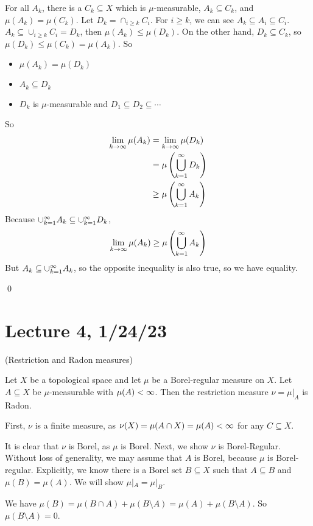 \documentclass[x11names,reqno,14pt]{extarticle}
\newcommand{\seq}[1]{_{#1 = 1}^\oo}
\newcommand{\cupk}{\cup\seq{k}}
\newcommand{\bigcupk}{\bigcup\seq{k}}
\begin{document}
For all $A_k$, there is a $C_k\subseteq X$ which is $\mu$-measurable, $A_k \subseteq C_k$, and $\mu(A_k) = \mu(C_k)$. Let $D_k = \cap_{i\geq k}C_i$. For $i \geq k$, we can see $A_k \subseteq A_i \subseteq C_i$. $A_k \subseteq \cup_{i\geq k}C_i = D_k$, then $\mu(A_k)\leq\mu(D_k)$. On the other hand, $D_k\subseteq C_k$, so $\mu(D_k)\leq\mu(C_k) = \mu(A_k)$. So
\begin{itemize}
\item $\mu(A_k) = \mu(D_k)$ 
\item $A_k \subseteq D_k$ 
\item $D_k$ is $\mu$-measurable and $D_1 \subseteq D_2 \subseteq \cdots $
\end{itemize}
So
\begin{align*}
\lim_{k\to\oo}\mu(A_k) & = \lim_{k\to\oo}\mu(D_k) \\
						      & = \mu\left(\bigcupk D_k\right) \\
								& \geq \mu\left(\bigcupk A_k\right) \\
\end{align*}
Because $\cupk A_k \subseteq \cupk D_k$, 
\[
\lim_{k\to\oo}\mu(A_k)\geq\mu\left(\bigcupk A_k\right) 
\]
But $A_k \subseteq \cupk A_k$, so the opposite inequality is also true, so we have equality. 

\qed

\section*{Lecture 4, 1/24/23}

\thm (Restriction and Radon measures)

Let $X$ be a topological space and let $\mu$ be a Borel-regular measure on $X$. Let $A \subseteq X$ be $\mu$-measurable with $\mu(A)<\infty$. Then the restriction measure $\nu = \mu|_A$ is Radon. 

\proof

First, $\nu$ is a finite measure, as $\nu(X) = \mu(A \cap X) = \mu(A) < \infty$ for any $C \subseteq X$. 

It is clear that $\nu$ is Borel, as $\mu$ is Borel. Next, we show $\nu$ is Borel-Regular. Without loss of generality, we may assume that $A$ is Borel, because $\mu$ is Borel-regular. Explicitly, we know there is a Borel set $B \subseteq X$ such that $A \subseteq B$ and $\mu(B) = \mu(A)$. We will show $\mu|_A = \mu|_B$. 

We have $\mu(B) = \mu(B \cap A) + \mu(B \setminus A) = \mu(A) + \mu(B \setminus A)$. So $\mu(B\setminus A) = 0$. 
\end{document}
